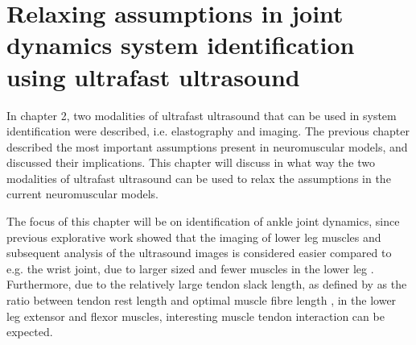 
\chapter{Relaxing assumptions in joint dynamics system identification using ultrafast ultrasound}
\label{chap:remove_assumptions}

In chapter 2, two modalities of ultrafast ultrasound that can be used in system identification were described, i.e. elastography and imaging. The previous chapter described the most important assumptions present in neuromuscular models, and discussed their implications.  This chapter will discuss in what way the two modalities of ultrafast ultrasound can be used to relax the assumptions in the current neuromuscular models.

The focus of this chapter will be on identification of ankle joint dynamics, since previous explorative work showed that the imaging of lower leg muscles and subsequent analysis of the ultrasound images is considered easier compared to e.g. the wrist joint, due to larger sized and fewer muscles in the lower leg \cite{ossenkoppele_ultrasound_2017}. Furthermore, due to the relatively large tendon slack length, as defined by \citeauthor{zajac_muscle_1989} as the ratio between tendon rest length and optimal muscle fibre length \cite{zajac_muscle_1989}, in the lower leg extensor and flexor muscles, interesting muscle tendon interaction can be expected. 



